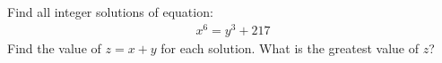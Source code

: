 Find all integer solutions of equation:
\begin{align*}
x^{6} = y^{3} + 217
\end{align*}
Find the value of $z=x+y$ for each solution. What is the greatest value of $z$?
